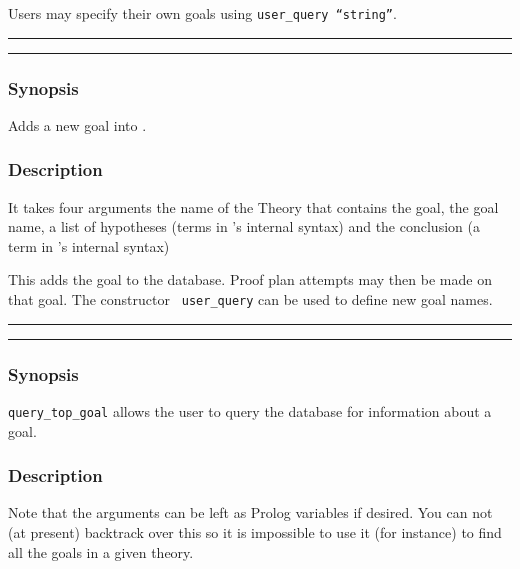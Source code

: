 Users may specify their own goals using {\tt user\_query ``string''}. 

\vspace{2mm}
\hrule 
\vspace{2mm}
\begin{Large}
\end{Large}
\vspace{2mm}
\hrule
\vspace{2mm}


\subsubsection*{Synopsis}
Adds a new goal into \lclam.  

\subsubsection*{Description}
It takes four arguments the name
of the Theory that contains 
the goal, the goal name, a list of hypotheses (terms in \lclam's
internal syntax) and the conclusion (a term in \lclam's
internal syntax)

This adds the goal to the database.  Proof plan attempts may then be
made on that goal.  The constructor {\tt
  user\_query} can be used to define new goal names.

\vspace{2mm}
\hrule 
\vspace{2mm}
\begin{Large}
\end{Large}
\vspace{2mm}
\hrule
\vspace{2mm}


\subsubsection*{Synopsis}
{\tt query\_top\_goal} allows the user to query the database for
information about a goal.  

\subsubsection*{Description}
Note that the arguments can be
left as Prolog variables if desired.  You can not (at present)
backtrack over this so it is impossible to use it (for instance) to
find all the goals in a given theory.


